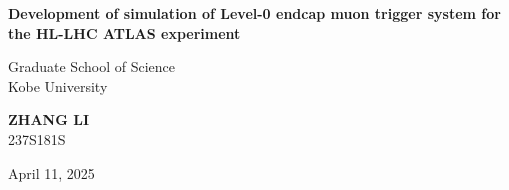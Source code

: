 \thispagestyle{empty}
\begin{center}
\vspace*{\fill}
\huge{\textbf{Development of simulation of Level-0 endcap muon trigger system for the HL-LHC ATLAS experiment}}

\vspace{0.2\textheight}
\large{Graduate School of Science \\ Kobe University}

\vspace{0.1\textheight}
\large{\textbf{ZHANG LI} \\ 237S181S}

\vspace{0.1\textheight}
\large{April 11, 2025}

\end{center}

\clearpage
\thispagestyle{empty}
\null
\clearpage


\newpage
\thispagestyle{empty}

\begin{comment}
\newpage
\thispagestyle{empty}

\vspace*{\fill}

\begin{tabular*}{\textwidth}{l @{\extracolsep{\fill}} l}
Gutachter/innen der Dissertation: & Dr.~Alexander Glazov \\
& Prof.~Dr.~Kerstin Tackmann \\
\\
Zusammensetzung der Prüfungskommission: & Dr.~Alexander Glazov \\
& Prof.~Dr.~Johannes Haller\\
& Prof.~Dr.~Jochen Liske \\
& Dr.~Kai Schmidt-Hoberg  \\
& Prof.~Dr.~Kerstin Tackmann \\
\\
Vorsitzender der Prüfungskommission: & Prof.~Dr.~Jochen Liske \\
\\
Datum der Disputation: & 23.08.2022 \\ %
\\
Vorsitzender Fach-Promotionsausschusses PHYSIK: &  Prof.~Dr.~Wolfgang J.~Parak \\
\\
Leiter des Fachbereichs PHYSIK: & Prof.~Dr.~Günter H.~W.~Sigl \\
\\
Dekan der Fakultät MIN: & Prof.~Dr.-Ing.~Norbert Ritter \\
\end{tabular*}

\newpage
\thispagestyle{empty}
\end{comment}

